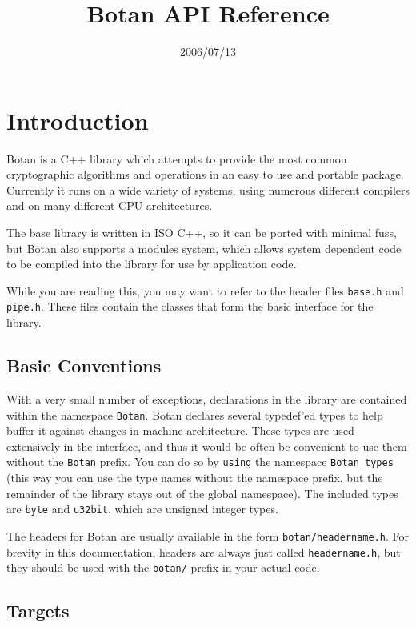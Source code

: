\documentclass{article}
\title{\textbf{Botan API Reference}}
\author{}
\date{2006/07/13}
\newcommand{\filename}[1]{\texttt{#1}}
\newcommand{\keyword}[1]{\texttt{#1}}
\newcommand{\type}[1]{\texttt{#1}}
\newcommand{\namespace}[1]{\texttt{#1}}
\begin{document}
\maketitle

\tableofcontents

\parskip=5pt
\pagebreak

\section{Introduction}

Botan is a C++ library which attempts to provide the most common cryptographic
algorithms and operations in an easy to use and portable package. Currently it
runs on a wide variety of systems, using numerous different compilers and on
many different CPU architectures.

The base library is written in ISO C++, so it can be ported with minimal fuss,
but Botan also supports a modules system, which allows system dependent code
to be compiled into the library for use by application code.

While you are reading this, you may want to refer to the header files
\filename{base.h} and \filename{pipe.h}. These files contain the classes that
form the basic interface for the library.

\subsection{Basic Conventions}

With a very small number of exceptions, declarations in the library are
contained within the namespace \namespace{Botan}. Botan declares several
typedef'ed types to help buffer it against changes in machine architecture.
These types are used extensively in the interface, and thus it would be often
be convenient to use them without the \namespace{Botan} prefix. You can do so
by \keyword{using} the namespace \namespace{Botan\_types} (this way you can use
the type names without the namespace prefix, but the remainder of the library
stays out of the global namespace). The included types are \type{byte} and
\type{u32bit}, which are unsigned integer types.

The headers for Botan are usually available in the form
\filename{botan/headername.h}. For brevity in this documentation,
headers are always just called \filename{headername.h}, but they
should be used with the \filename{botan/} prefix in your actual code.

\subsection{Targets}
\end{document}
